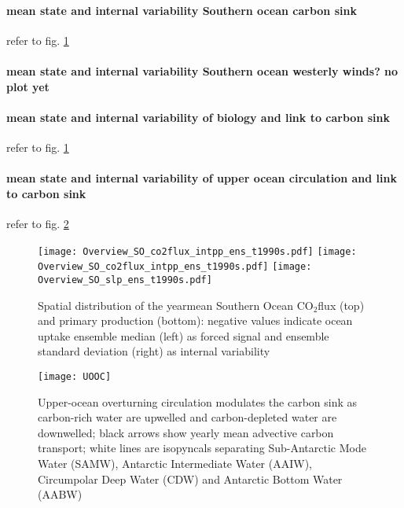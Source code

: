 \documentclass[12pt]{article}
\begin{document}
\paragraph{mean state and internal variability Southern ocean carbon sink} 
refer to fig. \ref{fig:SOCS_ensmean_ensstd}

\paragraph{mean state and internal variability Southern ocean westerly winds? no plot yet}

\paragraph{mean state and internal variability of biology and link to carbon sink} 
refer to fig. \ref{fig:SOCS_ensmean_ensstd}

\paragraph{mean state and internal variability of upper ocean circulation and link to carbon sink}
refer to fig. \ref{fig:UOOC_mean}


\begin{figure}[h!]
\centering
\texttt{[image: Overview\_SO\_co2flux\_intpp\_ens\_t1990s.pdf]} %
\texttt{[image: Overview\_SO\_co2flux\_intpp\_ens\_t1990s.pdf]} %
\texttt{[image: Overview\_SO\_slp\_ens\_t1990s.pdf]} %
\caption{Spatial distribution of the yearmean Southern Ocean CO$_2$flux (top) and primary production (bottom): negative values indicate ocean uptake ensemble median (left) as forced signal and ensemble standard deviation (right) as internal variability}
\label{fig:SOCS_ensmean_ensstd}
\end{figure}



\begin{figure}[h!]
\centering
\texttt{[image: UOOC]}
\vspace{-8mm}
\caption{Upper-ocean overturning circulation modulates the carbon sink as carbon-rich water are upwelled and carbon-depleted water are downwelled; black arrows show yearly mean advective carbon transport; white lines are isopyncals separating Sub-Antarctic Mode Water (SAMW), Antarctic Intermediate Water (AAIW), Circumpolar Deep Water (CDW) and Antarctic Bottom Water (AABW)}
	\label{fig:UOOC_mean}
\end{figure}
\end{document}
